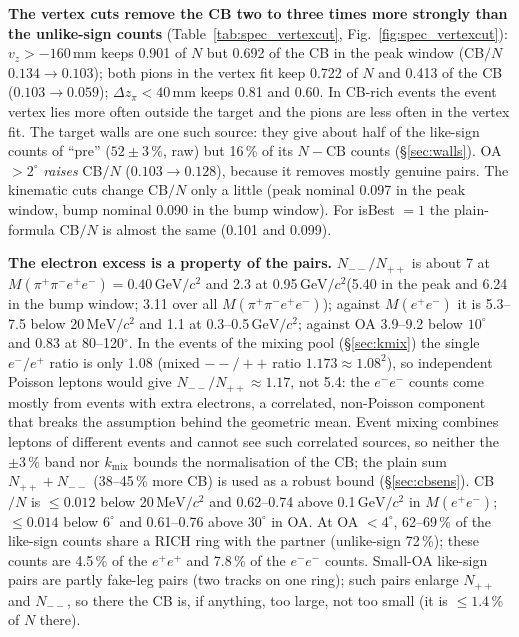 \documentclass[11pt,a4paper]{article}
\newcommand{\Mfour}{\ensuremath{M(\pi^{+}\pi^{-}e^{+}e^{-})}\xspace}
\newcommand{\Mee}{\ensuremath{M(e^{+}e^{-})}\xspace}
\newcommand{\GeVcc}{\ensuremath{\mathrm{GeV}/c^{2}}\xspace}
\newcommand{\MeVcc}{\ensuremath{\mathrm{MeV}/c^{2}}\xspace}
\newcommand{\dzpi}{\ensuremath{\Delta z_\pi}\xspace}
\newcommand{\vz}{\ensuremath{v_z}\xspace}
\begin{document}
\textbf{The vertex cuts remove the CB two to three times more strongly than the unlike-sign counts}
(Table~\ref{tab:spec_vertexcut}, Fig.~\ref{fig:spec_vertexcut}): $\vz>-160$\,mm keeps 0.901 of $N$ but 0.692 of the CB
in the peak window (CB$/N$ $0.134\to0.103$); both pions in the vertex fit keep 0.722 of $N$ and 0.413 of the CB
($0.103\to0.059$); $\dzpi<40$\,mm keeps 0.81 and 0.60. In CB-rich events the event vertex lies more often outside
the target and the pions are less often in the vertex fit. The target walls are one such source: they give about half of the like-sign
counts of ``pre'' ($52\pm3$\,\%, raw) but 16\,\% of its $N-\mathrm{CB}$ counts (\S\ref{sec:walls}). OA$>2^\circ$ \emph{raises} CB$/N$ ($0.103\to0.128$),
because it removes mostly genuine pairs. The kinematic cuts change CB$/N$ only a little (peak nominal 0.097 in
the peak window, bump nominal 0.090 in the bump window). For isBest $=1$ the plain-formula CB$/N$ is almost the
same (0.101 and 0.099).

\textbf{The electron excess is a property of the pairs.} $N_{--}/N_{++}$ is about 7 at $\Mfour=0.40$\,\GeVcc and 2.3
at 0.95\,\GeVcc (5.40 in the peak and 6.24 in the bump window; 3.11 over all \Mfour); against \Mee it is 5.3--7.5
below 20\,\MeVcc and 1.1 at 0.3--0.5\,\GeVcc; against OA 3.9--9.2 below $10^\circ$ and 0.83 at 80--120$^\circ$. In the
events of the mixing pool (\S\ref{sec:kmix}) the single $e^-/e^+$ ratio is only 1.08 (mixed $--/++$ ratio
$1.173\approx1.08^2$), so independent Poisson leptons would give $N_{--}/N_{++}\approx1.17$, not 5.4: the $e^-e^-$ counts come
mostly from events with extra electrons, a correlated, non-Poisson component that breaks the assumption behind the
geometric mean. Event mixing combines leptons of different events and cannot see such correlated sources, so neither
the $\pm3$\,\% band nor $k_{\mathrm{mix}}$ bounds the normalisation of the CB; the plain sum $N_{++}+N_{--}$ (38--45\,\% more CB)
is used as a robust bound (\S\ref{sec:cbsens}). CB$/N$ is $\le0.012$ below 20\,\MeVcc and 0.62--0.74 above 0.1\,\GeVcc in \Mee;
$\le0.014$ below $6^\circ$ and 0.61--0.76 above $30^\circ$ in OA. At OA $<4^\circ$, 62--69\,\% of the like-sign counts share a
RICH ring with the partner (unlike-sign 72\,\%); these counts are 4.5\,\% of the $e^+e^+$ and 7.8\,\% of the $e^-e^-$ counts.
Small-OA like-sign pairs are partly fake-leg pairs (two tracks on one ring); such pairs enlarge $N_{++}$ and $N_{--}$, so
there the CB is, if anything, too large, not too small (it is $\le1.4$\,\% of $N$ there).
\end{document}
